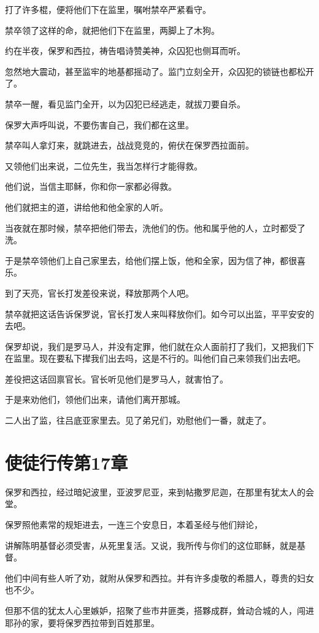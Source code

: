 \documentclass[12pt,oneside]{book}
\begin{document}
打了许多棍，便将他们下在监里，嘱咐禁卒严紧看守。

禁卒领了这样的命，就把他们下在监里，两脚上了木狗。

约在半夜，保罗和西拉，祷告唱诗赞美神，众囚犯也侧耳而听。

忽然地大震动，甚至监牢的地基都摇动了。监门立刻全开，众囚犯的锁链也都松开了。

禁卒一醒，看见监门全开，以为囚犯已经逃走，就拔刀要自杀。

保罗大声呼叫说，不要伤害自己，我们都在这里。

禁卒叫人拿灯来，就跳进去，战战竞竞的，俯伏在保罗西拉面前。

又领他们出来说，二位先生，我当怎样行才能得救。

他们说，当信主耶稣，你和你一家都必得救。

他们就把主的道，讲给他和他全家的人听。

当夜就在那时候，禁卒把他们带去，洗他们的伤。他和属乎他的人，立时都受了洗。

于是禁卒领他们上自己家里去，给他们摆上饭，他和全家，因为信了神，都很喜乐。

到了天亮，官长打发差役来说，释放那两个人吧。

禁卒就把这话告诉保罗说，官长打发人来叫释放你们。如今可以出监，平平安安的去吧。

保罗却说，我们是罗马人，并没有定罪，他们就在众人面前打了我们，又把我们下在监里。现在要私下撵我们出去吗，这是不行的。叫他们自己来领我们出去吧。

差役把这话回禀官长。官长听见他们是罗马人，就害怕了。

于是来劝他们，领他们出来，请他们离开那城。

二人出了监，往吕底亚家里去。见了弟兄们，劝慰他们一番，就走了。

\chapter{使徒行传第17章}
保罗和西拉，经过暗妃波里，亚波罗尼亚，来到帖撒罗尼迦，在那里有犹太人的会堂。

保罗照他素常的规矩进去，一连三个安息日，本着圣经与他们辩论，

讲解陈明基督必须受害，从死里复活。又说，我所传与你们的这位耶稣，就是基督。

他们中间有些人听了劝，就附从保罗和西拉。并有许多虔敬的希腊人，尊贵的妇女也不少。

但那不信的犹太人心里嫉妒，招聚了些市井匪类，搭夥成群，耸动合城的人，闯进耶孙的家，要将保罗西拉带到百姓那里。
\end{document}
